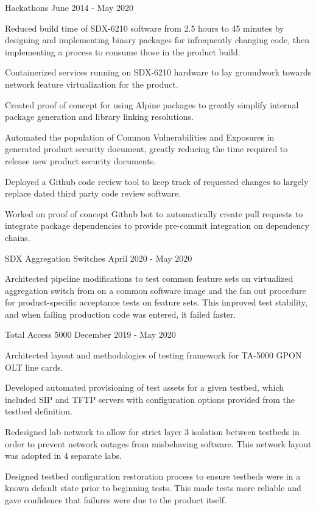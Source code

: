 
\begin{cventries}
  \cventry
    {} {Hackathons} {} {June 2014 - May 2020} {
      \begin{cvitems}
      \item {Reduced build time of SDX-6210 software from 2.5 hours to 45 minutes by designing and implementing binary packages for infrequently changing code, then implementing a process to consume those in the product build.}
        \item {Containerized services running on SDX-6210 hardware to lay groundwork towards network feature virtualization for the product.}
        \item {Created proof of concept for using Alpine packages to greatly simplify internal package generation and library linking resolutions.}
        \item {Automated the population of Common Vulnerabilities and Exposures in generated product security document, greatly reducing the time required to release new product security documents.}
        \item {Deployed a Github code review tool to keep track of requested changes to largely replace dated third party code review software.}
        \item {Worked on proof of concept Github bot to automatically create pull requests to integrate package dependencies to provide pre-commit integration on dependency chains.}
      \end{cvitems}
    }

  \cventry
    {} {SDX Aggregation Switches} {} {April 2020 - May 2020} {
      \begin{cvitems}
        \item {Architected pipeline modifications to test common feature sets on virtualized aggregation switch from on a common software image and the fan out procedure for product-specific acceptance tests on feature sets. This improved test stability, and when failing production code was entered, it failed faster.}
      \end{cvitems}
    }

  \cventry
    {} {Total Access 5000} {} {December 2019 - May 2020} {
      \begin{cvitems}
        \item {Architected layout and methodologies of testing framework for TA-5000 GPON OLT line cards.}
        \item {Developed automated provisioning of test assets for a given testbed, which included SIP and TFTP servers with configuration options provided from the testbed definition.}
        \item {Redesigned lab network to allow for strict layer 3 isolation between testbeds in order to prevent network outages from misbehaving software. This network layout was adopted in 4 separate labs.}
        \item {Designed testbed configuration restoration process to ensure testbeds were in a known default state prior to beginning tests. This made tests more reliable and gave confidence that failures were due to the product itself.}
      \end{cvitems}
    }


\end{cventries}
